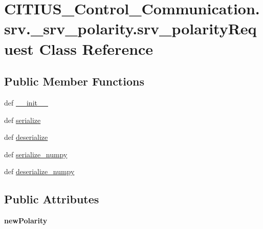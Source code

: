 \hypertarget{class_c_i_t_i_u_s___control___communication_1_1srv_1_1__srv__polarity_1_1srv__polarity_request}{\section{\-C\-I\-T\-I\-U\-S\-\_\-\-Control\-\_\-\-Communication.\-srv.\-\_\-srv\-\_\-polarity.\-srv\-\_\-polarity\-Request \-Class \-Reference}
\label{class_c_i_t_i_u_s___control___communication_1_1srv_1_1__srv__polarity_1_1srv__polarity_request}
}
\subsection*{\-Public \-Member \-Functions}
\begin{DoxyCompactItemize}
\item 
def \hyperlink{class_c_i_t_i_u_s___control___communication_1_1srv_1_1__srv__polarity_1_1srv__polarity_request_ac680b8911d0d682ded07d71b7d248cdb}{\-\_\-\-\_\-init\-\_\-\-\_\-}
\item 
def \hyperlink{class_c_i_t_i_u_s___control___communication_1_1srv_1_1__srv__polarity_1_1srv__polarity_request_a2186dc5b05157141262ba9773ab61176}{serialize}
\item 
def \hyperlink{class_c_i_t_i_u_s___control___communication_1_1srv_1_1__srv__polarity_1_1srv__polarity_request_a5de872065a8f242afe0e144919f3db4a}{deserialize}
\item 
def \hyperlink{class_c_i_t_i_u_s___control___communication_1_1srv_1_1__srv__polarity_1_1srv__polarity_request_a6e9ea3046c0eea812da345b737d93f76}{serialize\-\_\-numpy}
\item 
def \hyperlink{class_c_i_t_i_u_s___control___communication_1_1srv_1_1__srv__polarity_1_1srv__polarity_request_ab9ff9a803e59ff411de915fff840347a}{deserialize\-\_\-numpy}
\end{DoxyCompactItemize}
\subsection*{\-Public \-Attributes}
\begin{DoxyCompactItemize}
\item 
\hypertarget{class_c_i_t_i_u_s___control___communication_1_1srv_1_1__srv__polarity_1_1srv__polarity_request_a3f4dd5588481a56161ead33c71debfb2}{{\bfseries new\-Polarity}}\label{class_c_i_t_i_u_s___control___communication_1_1srv_1_1__srv__polarity_1_1srv__polarity_request_a3f4dd5588481a56161ead33c71debfb2}

\end{DoxyCompactItemize}
